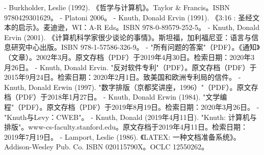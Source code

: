 \begin{enumerate}
- Burkholder, Leslie (1992). 《哲学与计算机》。Taylor & Francis。ISBN 9780429301629。
- Platoni 2006。
- Knuth, Donald Ervin (1991). 《3:16 : 圣经文本的启示》。麦迪逊，WI：A-R Eds。ISBN 978-0-89579-252-5。
- Knuth, Donald Ervin (2001). 《计算机科学家很少谈论的事情》。斯坦福，加利福尼亚：语言与信息研究中心出版。ISBN 978-1-57586-326-9。
- "所有问题的答案"（PDF）。《通知》（文章）。2002年3月。原文存档（PDF）于2019年4月30日。检索日期：2020年3月26日。
- Knuth, Donald Ervin. "反对软件专利"（PDF）。原文存档（PDF）于2015年9月24日。检索日期：2020年2月1日。致美国和欧洲专利局的信件。
- Knuth, Donald Erwin (1997). "数字排版（京都奖讲座，1996）"（PDF）。原文存档（PDF）于2018年1月27日。
- Knuth, Donald Erwin (1984). "文学编程"（PDF）。原文存档（PDF）于2019年8月19日。检索日期：2020年3月26日。
- "Knuth与Levy：CWEB"。
- Knuth, Donald (2019年4月11日). "Knuth: 计算机与排版"。www-cs-faculty.stanford.edu。原文存档于2019年4月11日。检索日期：2019年7月19日。
- Lamport, Leslie (1986). 《LATEX: 一种文档准备系统》。Addison-Wesley Pub. Co. ISBN 020115790X。OCLC 12550262。
\end{enumerate}